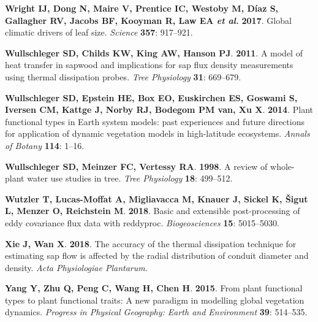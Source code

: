 \documentclass[11pt,twoside]{reedthesis}
\begin{document}
\hypertarget{ref-wright_global_2017}{}
\textbf{\textnormal{Wright IJ}, \textnormal{Dong N}, \textnormal{Maire
V}, \textnormal{Prentice IC}, \textnormal{Westoby M}, \textnormal{Díaz
S}, \textnormal{Gallagher RV}, \textnormal{Jacobs BF},
\textnormal{Kooyman R}, \textnormal{Law EA} \emph{et al.}}
\textbf{2017}. Global climatic drivers of leaf size. \emph{Science}
\textbf{357}: 917--921.

\hypertarget{ref-Wullschleger2011}{}
\textbf{\textnormal{Wullschleger SD}, \textnormal{Childs KW},
\textnormal{King AW}, \textnormal{Hanson PJ}}. \textbf{2011}. A model of
heat transfer in sapwood and implications for sap flux density
measurements using thermal dissipation probes. \emph{Tree Physiology}
\textbf{31}: 669--679.

\hypertarget{ref-Wullschleger2014}{}
\textbf{\textnormal{Wullschleger SD}, \textnormal{Epstein HE},
\textnormal{Box EO}, \textnormal{Euskirchen ES}, \textnormal{Goswami S},
\textnormal{Iversen CM}, \textnormal{Kattge J}, \textnormal{Norby RJ},
\textnormal{Bodegom PM van}, \textnormal{Xu X}}. \textbf{2014}. Plant
functional types in Earth system models: past experiences and future
directions for application of dynamic vegetation models in high-latitude
ecosystems. \emph{Annals of Botany} \textbf{114}: 1--16.

\hypertarget{ref-Wullschleger1998}{}
\textbf{\textnormal{Wullschleger SD}, \textnormal{Meinzer FC},
\textnormal{Vertessy RA}}. \textbf{1998}. A review of whole-plant water
use studies in tree. \emph{Tree Physiology} \textbf{18}: 499--512.

\hypertarget{ref-Wutzler2018}{}
\textbf{\textnormal{Wutzler T}, \textnormal{Lucas-Moffat A},
\textnormal{Migliavacca M}, \textnormal{Knauer J}, \textnormal{Sickel
K}, \textnormal{Šigut L}, \textnormal{Menzer O}, \textnormal{Reichstein
M}}. \textbf{2018}. Basic and extensible post-processing of eddy
covariance flux data with reddyproc. \emph{Biogeosciences} \textbf{15}:
5015--5030.

\hypertarget{ref-Xie2018}{}
\textbf{\textnormal{Xie J}, \textnormal{Wan X}}. \textbf{2018}. The
accuracy of the thermal dissipation technique for estimating sap flow is
affected by the radial distribution of conduit diameter and density.
\emph{Acta Physiologiae Plantarum}.

\hypertarget{ref-Yang2015}{}
\textbf{\textnormal{Yang Y}, \textnormal{Zhu Q}, \textnormal{Peng C},
\textnormal{Wang H}, \textnormal{Chen H}}. \textbf{2015}. From plant
functional types to plant functional traits: A new paradigm in modelling
global vegetation dynamics. \emph{Progress in Physical Geography: Earth
and Environment} \textbf{39}: 514--535.
\end{document}

